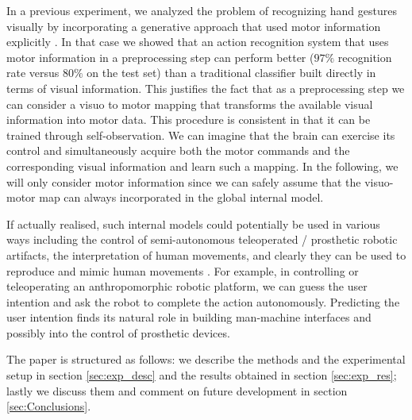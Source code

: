 In a previous experiment, we analyzed the problem of recognizing hand
gestures visually by incorporating a generative approach that used
motor information explicitly \cite{lopes-05,metta-06}. In that case we
showed that an action recognition system that uses motor information
in a preprocessing step can perform better ($97\%$ recognition rate
versus $80\%$ on the test set) than a traditional classifier built
directly in terms of visual information. This justifies the fact that
as a preprocessing step we can consider a visuo to motor mapping that
transforms the available visual information into motor data. This
procedure is consistent in that it can be trained through 
self-observation. We can imagine that the brain can exercise its
control and simultaneously acquire both the motor commands and the
corresponding visual information and learn such a mapping. In the
following, we will only consider motor information since we can safely
assume that the visuo-motor map can always incorporated in the global
internal model.

If actually realised, such internal models could potentially be used
in various ways including the control of semi-autonomous teleoperated
/ prosthetic robotic artifacts, the interpretation of human movements,
and clearly they can be used to reproduce and mimic human movements
\cite{wolpert-01}. For example, in controlling or teleoperating an
anthropomorphic robotic platform, we can guess the user intention and
ask the robot to complete the action autonomously. Predicting the user
intention finds its natural role in building man-machine interfaces
and possibly into the control of prosthetic devices.

The paper is structured as follows: we describe the methods and the
experimental setup in section \ref{sec:exp_desc} and the results
obtained in section \ref{sec:exp_res}; lastly we discuss them and
comment on future development in section \ref{sec:Conclusions}.
